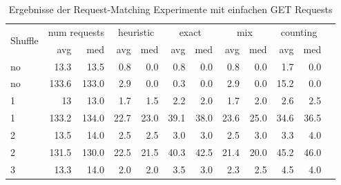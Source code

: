 \documentclass[12pt,a4paper]{report}
\begin{document}
\begin{table}[H]
	\centering
	\caption{Ergebnisse der Request-Matching Experimente mit einfachen GET Requests}
	\label{tab:get}
	\begin{tabular}{|l|r|r|r|r|r|r|r|r|r|r|r|}
		\hline
		\multirow{2}{*}{Shuffle} & \multicolumn{2}{|c|}{num requests} & \multicolumn{2}{|c|}{heuristic} & \multicolumn{2}{|c|}{exact} & \multicolumn{2}{|c|}{mix} & \multicolumn{2}{|c|}{counting}                                    \\ \cline{2-11}
		                         & avg                                & med                             & avg                         & med                       & avg                            & med  & avg  & med  & avg  & med  \\ \hline
		no                       & 13.3                               & 13.5                            & 0.8                         & 0.0                       & 0.8                            & 0.0  & 0.8  & 0.0  & 1.7  & 0.0  \\ \hline
		no                       & 133.6                              & 133.0                           & 2.9                         & 0.0                       & 0.3                            & 0.0  & 2.9  & 0.0  & 15.2 & 0.0  \\ \hline
		1                        & 13                                 & 13.0                            & 1.7                         & 1.5                       & 2.2                            & 2.0  & 1.7  & 2.0  & 2.6  & 2.5  \\ \hline
		1                        & 133.2                              & 134.0                           & 22.7                        & 23.0                      & 39.1                           & 38.0 & 23.6 & 25.0 & 34.6 & 36.5 \\ \hline
		2                        & 13.5                               & 14.0                            & 2.5                         & 2.5                       & 3.0                            & 3.0  & 2.5  & 3.0  & 3.3  & 4.0  \\ \hline
		2                        & 131.5                              & 130.0                           & 22.5                        & 21.5                      & 40.3                           & 42.5 & 21.4 & 20.0 & 45.2 & 46.0 \\ \hline
		3                        & 13.3                               & 14.0                            & 2.0                         & 2.0                       & 3.5                            & 3.0  & 2.3  & 2.5  & 4.5  & 4.0  \\ \hline

\end{tabular}
\end{table}
\end{document}
